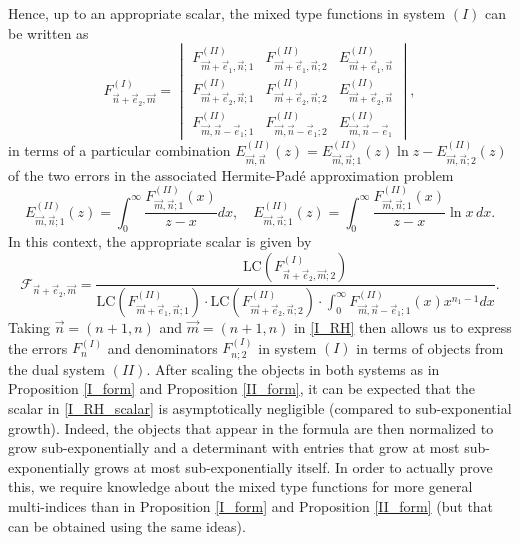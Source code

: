 \documentclass[a4paper,12pt,oneside]{article}
\theoremstyle{definition}
\begin{document}
Hence, up to an appropriate scalar, the mixed type functions in system $(I)$ can be written as  
\begin{equation} \label{I_RH}
    F_{\vec{n}+\vec{e}_2,\vec{m}}^{(I)} = \begin{vmatrix} F_{\vec{m}+\vec{e}_1,\vec{n};1}^{(II)} & F_{\vec{m}+\vec{e}_1,\vec{n};2}^{(II)} & E_{\vec{m}+\vec{e}_1,\vec{n}}^{(II)} \\ F_{\vec{m}+\vec{e}_2,\vec{n};1}^{(II)} & F_{\vec{m}+\vec{e}_2,\vec{n};2}^{(II)} & E_{\vec{m}+\vec{e}_2,\vec{n}}^{(II)} \\ 
    F_{\vec{m},\vec{n}-\vec{e}_1;1}^{(II)} & F_{\vec{m},\vec{n}-\vec{e}_1;2}^{(II)} & E_{\vec{m},\vec{n}-\vec{e}_1}^{(II)} \end{vmatrix},
\end{equation}
in terms of a particular combination $ E_{\vec{m},\vec{n}}^{(II)}(z) = E_{\vec{m},\vec{n};1}^{(II)}(z) \ln z - E_{\vec{m},\vec{n};2}^{(II)}(z)$ of the two errors in the associated Hermite-Padé approximation problem
    $$ E_{\vec{m},\vec{n};1}^{(II)}(z) = \int_0^\infty \frac{F_{\vec{m},\vec{n};1}^{(II)}(x)}{z-x} dx,\quad E_{\vec{m},\vec{n};1}^{(II)}(z) = \int_0^\infty \frac{F_{\vec{m},\vec{n};1}^{(II)}(x)}{z-x} \ln x \, dx. $$
In this context, the appropriate scalar is given by
\begin{equation} \label{I_RH_scalar}
    \mathcal{F}_{\vec{n}+\vec{e}_2,\vec{m}} = \frac{\text{LC}(F_{\vec{n}+\vec{e}_2,\vec{m};2}^{(I)})}{\text{LC}(F_{\vec{m}+\vec{e}_1,\vec{n};1}^{(II)}) \cdot \text{LC}(F_{\vec{m}+\vec{e}_2,\vec{n};2}^{(II)}) \cdot \int_0^\infty F_{\vec{m},\vec{n}-\vec{e}_1;1}^{(II)}(x) x^{n_1-1} dx }.
\end{equation}
Taking $\vec{n}=(n+1,n)$ and $\vec{m}=(n+1,n)$ in \eqref{I_RH} then allows us to express the errors $F_{n}^{(I)}$ and denominators $F_{n;2}^{(I)}$ in system $(I)$ in terms of objects from the dual system $(II)$. After scaling the objects in both systems as in Proposition \ref{I_form} and Proposition \ref{II_form}, it can be expected that the scalar in \eqref{I_RH_scalar} is asymptotically negligible (compared to sub-exponential growth). Indeed, the objects that appear in the formula are then normalized to grow sub-exponentially and a determinant with entries that grow at most sub-exponentially grows at most sub-exponentially itself. In order to actually prove this, we require knowledge about the mixed type functions for more general multi-indices than in Proposition \ref{I_form} and Proposition \ref{II_form} (but that can be obtained using the same ideas).
\medbreak
\end{document}
